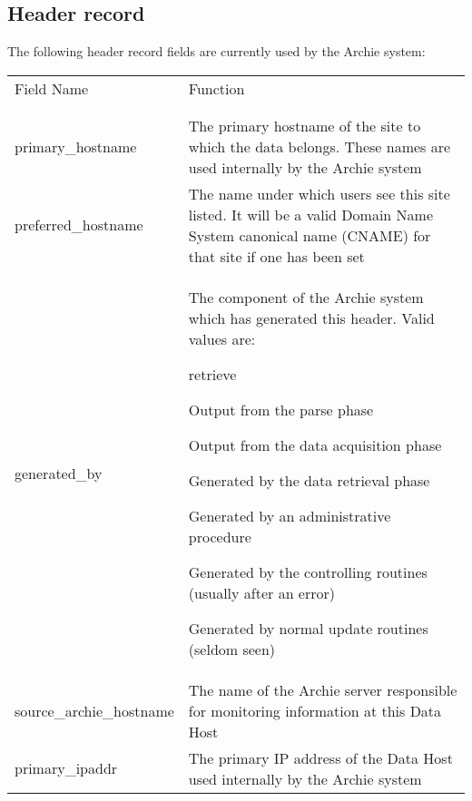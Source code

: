 %
%
%
%


\begin{appendix}



\chapter{Header record}
\label{app:header}


The following header record fields are currently used by the Archie system:


\setlongtables
\begin{longtable}[!]{lp{4.5in}}
Field Name & Function \\ \\  \hline \\
\endhead
\endfoot

primary\_hostname & 
The primary hostname of the site to which the data belongs. These names are
used internally by the Archie system
 \\

preferred\_hostname &
The name under which users see this site listed. It will be a valid Domain
Name System canonical name (CNAME) for that site if one has been set \\

generated\_by & 
The component of the Archie system which has generated this header. Valid
values are: 
\begin{TTentry}{retrieve}
\item[parser] Output from the parse phase
\item[retrieve] Output from the data acquisition phase
\item[server] Generated by the data retrieval phase
\item[admin] Generated by an administrative procedure
\item[control] Generated by the controlling routines (usually after an error)
\item[insert] Generated by normal update routines (seldom seen)
\end{TTentry} \\

source\_archie\_hostname &
The name of the Archie server responsible for monitoring information at this
Data Host \\

primary\_ipaddr & 
The primary IP address of the Data Host used internally by the Archie system \\


\end{longtable}
\end{appendix}
